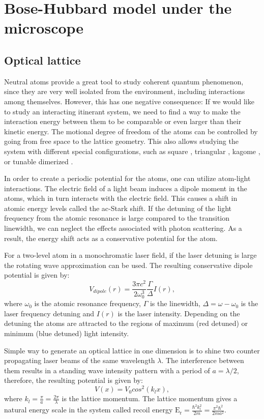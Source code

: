 
\chapter{Bose-Hubbard model under the microscope}

\section{Optical lattice}
Neutral atoms provide a great tool to study coherent quantum phenomenon, since they are very well isolated from the environment, including interactions among themselves. However, this has one negative consequence: If we would like to study an interacting itinerant system, we need to find a way to make the interaction energy between them to be comparable or even larger than their kinetic energy. The motional degree of freedom of the atoms can be controlled by going from free space to the lattice geometry. This also allows studying the system with different special configurations, such as square \cite{Greiner2002}, triangular \cite{Becker2010}, kagome \cite{Jo2012}, or tunable dimerized \cite{Greif2013}.

In order to create a periodic potential for the atoms, one can utilize atom-light interactions. The electric field of a light beam induces a dipole moment in the atoms, which in turn interacts with the electric field. This causes a shift in atomic energy levels called the ac-Stark shift. If the detuning of the light frequency from the atomic resonance is large compared to the transition linewidth, we can neglect the effects associated with photon scattering. As a result, the energy shift acts as a conservative potential for the atom.

For a two-level atom in a monochromatic laser field, if the laser detuning is large the rotating wave approximation can be used. The resulting conservative dipole potential is given by:
\begin{equation}
V_{dipole}(r) = \frac{3\pi c^2}{2\omega_0^3} \frac{\Gamma}{\Delta} I(r),
\end{equation}
where $\omega_0$ is the atomic resonance frequency, $\Gamma$ is the linewidth, $\Delta = \omega-\omega_0$ is the laser frequency detuning and $I(r)$ is the laser intensity. Depending on the detuning the atoms are attracted to the regions of maximum (red detuned) or minimum (blue detuned) light intensity. 

Simple way to generate an optical lattice in one dimension is to shine two counter propagating laser beams of the same wavelength $\lambda$. The interference between them results in a standing wave intensity pattern with a period of $a=\lambda/2$, therefore, the resulting potential is given by:
\begin{equation}
V(x) = V_0cos^2(k_l x),
\end{equation}
where $k_l = \frac{\pi}{a} =\frac{2\pi}{\lambda}$ is the lattice momentum. The lattice momentum gives a natural energy scale in the system called recoil energy $\mathrm{E_r} = \frac{\hbar^2 k_l^2}{2m} = \frac{\pi^2 \hbar^2}{2 m a^2}$.

